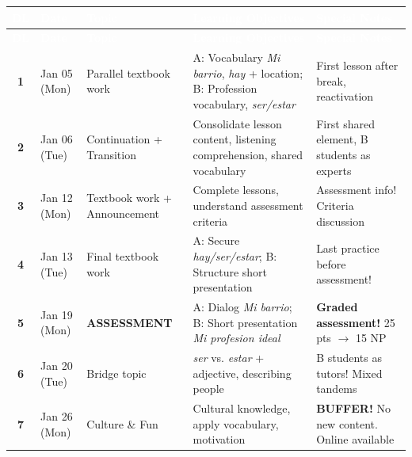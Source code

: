 \documentclass[11pt, a4paper]{article}
\newcommand{\es}[1]{\textcolor{spanisch}{\textit{#1}}}
\begin{document}
\renewcommand{\arraystretch}{1.4}
\small
\begin{longtable}{|c|p{2.2cm}|p{3.5cm}|p{4cm}|p{4cm}|}
\hline
\rowcolor{spanisch}
\textcolor{white}{\textbf{DL}} &
\textcolor{white}{\textbf{Date}} &
\textcolor{white}{\textbf{Topic}} &
\textcolor{white}{\textbf{Learning Objectives}} &
\textcolor{white}{\textbf{Special Notes}} \\
\hline
\endfirsthead
\hline
\rowcolor{spanisch}
\textcolor{white}{\textbf{DL}} &
\textcolor{white}{\textbf{Date}} &
\textcolor{white}{\textbf{Topic}} &
\textcolor{white}{\textbf{Learning Objectives}} &
\textcolor{white}{\textbf{Special Notes}} \\
\hline
\endhead

\textbf{1} & Jan 05 (Mon) & Parallel textbook work &
A: Vocabulary \es{Mi barrio}, \es{hay} + location; B: Profession vocabulary, \es{ser/estar} &
First lesson after break, reactivation \\
\hline

\textbf{2} & Jan 06 (Tue) & Continuation + Transition &
Consolidate lesson content, listening comprehension, shared vocabulary &
First shared element, B students as experts \\
\hline

\textbf{3} & Jan 12 (Mon) & Textbook work + Announcement &
Complete lessons, understand assessment criteria &
\textcolor{assessment}{Assessment info!} Criteria discussion \\
\hline

\textbf{4} & Jan 13 (Tue) & Final textbook work &
A: Secure \es{hay/ser/estar}; B: Structure short presentation &
\textcolor{assessment}{Last practice before assessment!} \\
\hline

\rowcolor{yellow!20}
\textbf{5} & Jan 19 (Mon) & \textbf{ASSESSMENT} &
A: Dialog \es{Mi barrio}; B: Short presentation \es{Mi profesion ideal} &
\textcolor{assessment}{\textbf{Graded assessment!}} 25 pts $\rightarrow$ 15 NP \\
\hline

\textbf{6} & Jan 20 (Tue) & Bridge topic &
\es{ser} vs. \es{estar} + adjective, describing people &
\textcolor{gruppeB}{B students as tutors!} Mixed tandems \\
\hline

\rowcolor{purple!10}
\textbf{7} & Jan 26 (Mon) & \textcolor{puffer}{Culture \& Fun} &
Cultural knowledge, apply vocabulary, motivation &
\textcolor{puffer}{\textbf{BUFFER!}} No new content. Online available \\
\hline


\end{longtable}
\end{document}
